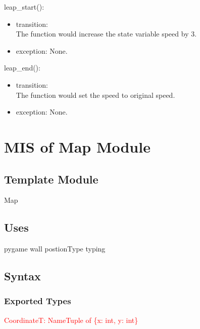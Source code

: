 \documentclass[12pt, titlepage]{article}
\begin{document}
        leap\_start():
		\begin{itemize}
		\item transition: \\
		The function would increase the state variable speed by 3.
		
		\item exception: None.
        \end{itemize}
        
        leap\_end():
		\begin{itemize}
		\item transition: \\
		The function would set the speed to original speed.
		
		\item exception: None.
        \end{itemize}
        
\section{MIS of Map Module}
        \subsection{Template Module}
        Map
        \subsection{Uses}
        pygame
        wall
        postionType
        typing
		\subsection{Syntax}
		\subsubsection{Exported Types}
		\textcolor{red}{CoordinateT: NameTuple of }
		\textcolor{red}{\{x: int, y: int\}}
		
\end{document}
